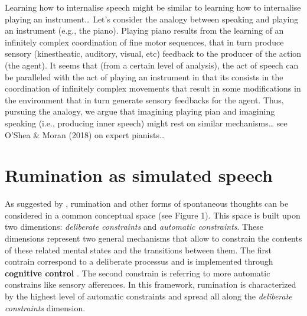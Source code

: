 \documentclass[12pt,]{book}
\theoremstyle{definition}
\theoremstyle{definition}
\theoremstyle{definition}
\theoremstyle{remark}
\begin{document}
Learning how to internalise speech might be similar to learning how to
internalise playing an instrument\ldots{} Let's consider the analogy
between speaking and playing an instrument (e.g., the piano). Playing
piano results from the learning of an infinitely complex coordination of
fine motor sequences, that in turn produce sensory (kinestheatic,
auditory, visual, etc) feedback to the producer of the action (the
agent). It seems that (from a certain level of analysis), the act of
speech can be paralleled with the act of playing an instrument in that
its consists in the coordination of infinitely complex movements that
result in some modifications in the environment that in turn generate
sensory feedbacks for the agent. Thus, pursuing the analogy, we argue
that imagining playing pian and imagining speaking (i.e., producing
inner speech) might rest on similar mechanisms\ldots{} see O'Shea \&
Moran (2018) on expert pianists\ldots{}

\section{Rumination as simulated
speech}\label{rumination-as-simulated-speech}

As suggested by \citet{Christoff2016}, rumination and other forms of
spontaneous thoughts can be considered in a common conceptual space (see
Figure 1). This space is built upon two dimensions: \emph{deliberate
constraints} and \emph{automatic constraints}. These dimensions
represent two general mechanisms that allow to constrain the contents of
these related mental states and the transitions between them. The first
contrain correspond to a deliberate processus and is implemented through
\textbf{cognitive control} \citep{Miller2000}. The second constrain is
referring to more automatic constrains like sensory afferences. In this
framework, rumination is characterized by the highest level of automatic
constraints and spread all along the \emph{deliberate constraints}
dimension.
\end{document}
